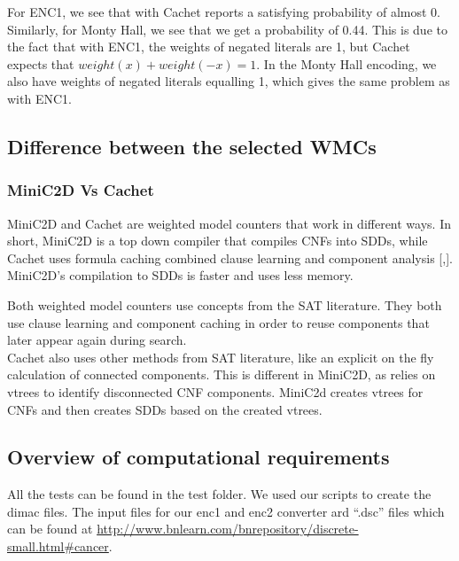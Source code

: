 For ENC1, we see that with Cachet reports a satisfying probability of almost 0.
Similarly, for Monty Hall, we see that we get a probability of 0.44.
This is due to the fact that with ENC1, the weights of negated literals are 1, but Cachet expects that $weight(x) + weight(-x) = 1$.
In the Monty Hall encoding, we also have weights of negated literals equalling 1, which gives the same problem as with ENC1.


\subsection{Difference between the selected WMCs}

\subsubsection{MiniC2D Vs Cachet}
MiniC2D and Cachet are weighted model counters that work in different ways. In short, MiniC2D is a top down compiler that compiles CNFs into SDDs, while Cachet uses formula caching combined clause learning and component analysis [\cite{MiniC2D},\cite{Cachet}]. MiniC2D's compilation to SDDs is faster and uses less memory.

Both weighted model counters use concepts from the SAT literature. They both use clause learning and component caching in order to reuse components that later appear again during search. \\
Cachet also uses other methods from SAT literature, like an explicit on the fly calculation of connected components. This is different in MiniC2D, as relies on vtrees to identify disconnected CNF components. MiniC2d creates vtrees for CNFs and then creates SDDs based on the created vtrees.


\subsection{Overview of computational requirements}
All the tests can be found in the test folder.
We used our scripts to create the dimac files. The input files for our enc1 and enc2 converter ard ``.dsc'' files which can be found at 
\url{http://www.bnlearn.com/bnrepository/discrete-small.html#cancer}.

